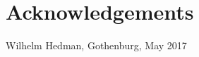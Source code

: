 \thispagestyle{plain}			%
\section*{Acknowledgements}


\vspace{1.5cm}
\hfill
Wilhelm Hedman, Gothenburg, May 2017

\newpage				%
\thispagestyle{empty}
\mbox{}